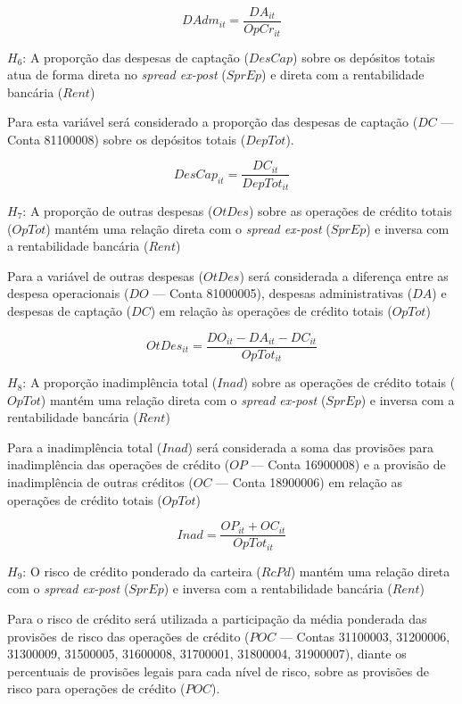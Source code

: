 \documentclass[
  12pt,
  12pt,
  openright,
  oneside,
  a4paper,
  chapter=TITLE,
  section=TITLE,
  subsection=TITLE,
  subsubsection=TITLE,
  english,
  portugues,
  sumario=tradicional]{abntex2}
\begin{document}
\begin{equation}
DAdm_{it} = \frac{DA_{it}}{OpCr_{it}}
\end{equation}

\(H_{6}\): A proporção das despesas de captação (\(DesCap\)) sobre os depósitos totais atua de forma direta no \emph{spread ex-post} (\(SprEp\)) e direta com a rentabilidade bancária (\(Rent\))

Para esta variável será considerado a proporção das despesas de captação (\(DC\) --- Conta 81100008) sobre os depósitos totais (\(DepTot\)).

\begin{equation}
DesCap_{it} = \frac{DC_{it}}{DepTot_{it}}
\end{equation}

\(H_{7}\): A proporção de outras despesas (\(OtDes\)) sobre as operações de crédito totais (\(OpTot\)) mantém uma relação direta com o \emph{spread ex-post} (\(SprEp\)) e inversa com a rentabilidade bancária (\(Rent\))

Para a variável de outras despesas (\(OtDes\)) será considerada a diferença entre as despesa operacionais (\(DO\) --- Conta 81000005), despesas administrativas (\(DA\)) e despesas de captação (\(DC\)) em relação às operações de crédito totais (\(OpTot\))

\begin{equation}
OtDes_{it} = \frac{ DO_{it} - DA_{it} - DC_{it} }{ OpTot_{it} }
\end{equation}

\(H_{8}\): A proporção inadimplência total (\(Inad\)) sobre as operações de crédito totais (\(OpTot\)) mantém uma relação direta com o \emph{spread ex-post} (\(SprEp\)) e inversa com a rentabilidade bancária (\(Rent\))

Para a inadimplência total (\(Inad\)) será considerada a soma das provisões para inadimplência das operações de crédito (\(OP\) --- Conta 16900008) e a provisão de inadimplência de outras créditos (\(OC\) --- Conta 18900006) em relação as operações de crédito totais (\(OpTot\))

\begin{equation}
Inad = \frac{ OP_{it} + OC_{it} }{OpTot_{it}}
\end{equation}

\(H_{9}\): O risco de crédito ponderado da carteira (\(RcPd\)) mantém uma relação direta com o \emph{spread ex-post} (\(SprEp\)) e inversa com a rentabilidade bancária (\(Rent\))

Para o risco de crédito será utilizada a participação da média ponderada das provisões de risco das operações de crédito (\(POC\) --- Contas 31100003, 31200006, 31300009, 31500005, 31600008, 31700001, 31800004, 31900007), diante os percentuais de provisões legais para cada nível de risco, sobre as provisões de risco para operações de crédito (\(POC\)).
\end{document}
